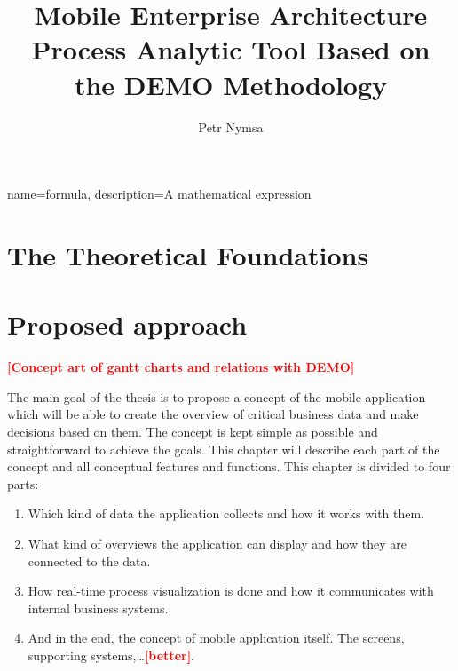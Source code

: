 \documentclass[thesis=B,english]{FITthesis}[2012/06/26]
\title{Mobile Enterprise Architecture Process Analytic Tool Based on the DEMO Methodology}
\author{Petr Nymsa} %
\newcommand{\todo}[1]{\textcolor{red}{\textbf{[#1]}}}
\begin{document}

{
        name=formula,
        description={A mathematical expression}
}


\begin{introduction}
	    
\end{introduction}

\chapter{The Theoretical Foundations}
\label{ch:theoretical-foundations}



\chapter{Proposed approach}
\todo{Concept art of gantt charts and relations with DEMO}

The main goal of the thesis is to propose a concept of the mobile application which will be able to create the overview of critical business data and make decisions based on them. The concept is kept simple as possible and straightforward to achieve the goals. This chapter will describe each part of the concept and all conceptual features and functions. This chapter is divided to four parts:	
    \begin{enumerate}
      \item Which kind of data the application collects and how it works with them.
      \item What kind of overviews the application can display and how they are connected to the data.
      \item How real-time process visualization is done and how it communicates with internal business systems.
      \item And in the end, the concept of mobile application itself. The screens, supporting systems,\dots \todo{better}.
    \end{enumerate}
    
\end{document}
